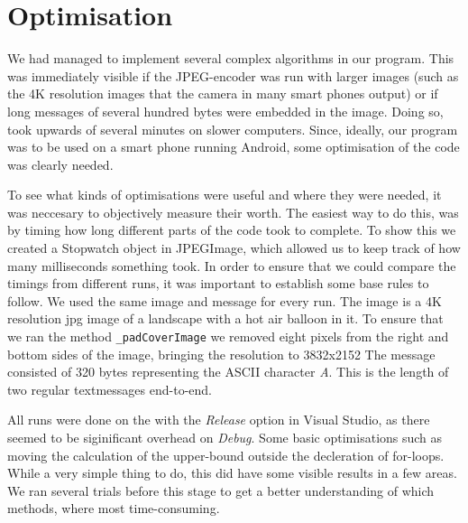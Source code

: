 \section{Optimisation}
We had managed to implement several complex algorithms in our program. 
This was immediately visible if the JPEG-encoder was run with larger images (such as the 4K resolution images that the camera in many smart phones output) or if long messages of several hundred bytes were embedded in the image.
Doing so, took upwards of several minutes on slower computers.
Since, ideally, our program was to be used on a smart phone running Android, some optimisation of the code was clearly needed.

To see what kinds of optimisations were useful and where they were needed, it was neccesary to objectively measure their worth.
The easiest way to do this, was by timing how long different parts of the code took to complete.
To show this we created a Stopwatch object in JPEGImage, which allowed us to keep track of how many milliseconds something took.
In order to ensure that we could compare the timings from different runs, it was important to establish some base rules to follow.
We used the same image and message for every run. 
The image is a 4K resolution jpg image of a landscape with a hot air balloon in it. 
To ensure that we ran the method \lstinline|_padCoverImage| we removed eight pixels from the right and bottom sides of the image, bringing the resolution to 3832x2152
The message consisted of 320 bytes representing the ASCII character \textit{A}. 
This is the length of two regular textmessages end-to-end.

All runs were done on the with the \textit{Release} option in Visual Studio, as there seemed to be siginificant overhead on \textit{Debug}.
Some basic optimisations such as moving the calculation of the upper-bound outside the decleration of for-loops.
While a very simple thing to do, this did have some visible results in a few areas.
We ran several trials before this stage to get a better understanding of which methods, where most time-consuming.

